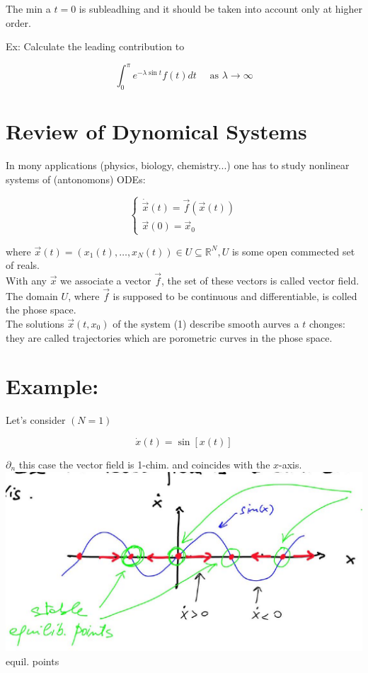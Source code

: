 \documentclass[10pt]{article}
\begin{document}
The min a $t=0$ is subleadhing and it should be taken into account only at higher order.

Ex: Calculate the leading contribution to

$$
\int_{0}^{\pi} e^{-\lambda \sin t} f(t) d t \quad \text { as } \lambda \rightarrow \infty
$$

\section*{Review of Dynomical Systems}
In mony applications (physics, biology, chemistry...) one has to study nonlinear systems of (antonomons) ODEs:

\[
\left\{\begin{array}{l}
\dot{\vec{x}}(t)=\vec{f}(\vec{x}(t))  \tag{1}\\
\vec{x}(0)=\vec{x}_{0}
\end{array}\right.
\]

where $\vec{x}(t)=\left(x_{1}(t), \ldots, x_{N}(t)\right) \in U \subseteq \mathbb{R}^{N}, U$ is some open commected set of reals.\\
With any $\vec{x}$ we associate a vector $\vec{f}$, the set of these vectors is called vector field. The domain $U$, where $\vec{f}$ is supposed to be continuous and differentiable, is colled the phose space.\\
The solutions $\vec{x}\left(t, x_{0}\right)$ of the system (1) describe smooth aurves a $t$ chonges: they are called trajectories which are porometric curves in the phose space.

\section*{Example:}
Let's consider $(N=1)$

$$
\dot{x}(t)=\sin [x(t)]
$$

$\partial_{n}$ this case the vector field is 1-chim. and coincides with the $x$-axis.\\
\includegraphics[max width=\textwidth]{2025_10_19_11b40f5928aca93f9d20g-4} equil. points
\end{document}
